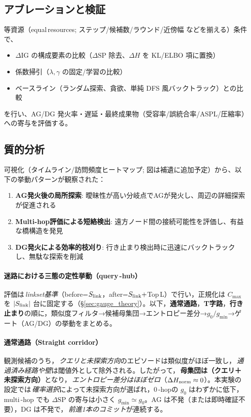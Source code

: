 \documentclass[ja=standard,xelatex]{bxjsarticle}
\begin{document}
\subsection{アブレーションと検証}
\label{sec:maze_ablation}
等資源（equal\,resources; ステップ/候補数/ラウンド/近傍幅 などを揃える）条件で、
\begin{itemize}
  \item $\Delta\mathrm{IG}$ の構成要素の比較（$\Delta\mathrm{SP}$ 除去、$\Delta H$ を KL/ELBO 項に置換）
  \item 係数掃引（$\lambda,\gamma$ の固定/学習の比較）
  \item ベースライン（ランダム探索、貪欲、単純 DFS 風バックトラック）との比較
\end{itemize}
を行い、AG/DG 発火率・遅延・最終成果物（受容率/誤統合率/ASPL/圧縮率）への寄与を評価する。

\subsection{質的分析}

可視化（タイムライン/訪問頻度ヒートマップ; 図は補遺に追加予定）から、以下の挙動パターンが観察された：
\begin{enumerate}
  \item \textbf{AG発火後の局所探索}: 曖昧性が高い分岐点でAGが発火し、周辺の詳細探索が促進される
  \item \textbf{Multi-hop評価による短絡検出}: 遠方ノード間の接続可能性を評価し、有益な橋構造を発見
  \item \textbf{DG発火による効率的枝刈り}: 行き止まり検出時に迅速にバックトラックし、無駄な探索を削減
\end{enumerate}

\paragraph{迷路における三態の定性挙動（query\,\mbox{-}hub）}
評価は\,\emph{linkset基準}（before=$S_{\rm link}$，after=$S_{\rm link}{+}$Top\,L）で行い，正規化は $C_{\max}$ を $|S_{\rm link}|$ 台に固定する（§\ref{sec:gauge_theory}）。以下，\textbf{通常通路}，\textbf{T字路}，\textbf{行き止まり}の順に，類似度フィルタ→候補母集団→エントロピー差分→$g_0/g_{\min}$→ゲート（AG/DG）の挙動をまとめる。

\paragraph{通常通路（Straight corridor）}
観測候補のうち，\,\emph{クエリと未探索方向}のエピソードは類似度がほぼ一致し，\,\emph{通過済み経路や壁}は閾値外として除外される。したがって，\,\textbf{母集団は（クエリ＋未探索方向）}となり，\,\emph{エントロピー差分はほぼゼロ}（$\Delta H_{\rm norm}\approx 0$）。本実験の設定では\,\emph{確率選択}によって未探索方向が選ばれ，0\,\mbox{-}hopの $g_0$ はわずかに低下，multi\,\mbox{-}hop でも $\Delta\mathrm{SP}$ の寄与は小さく $g_{\min}\simeq g_0$。AG は不発（または即時確証不要），DG は不発で，\,\emph{前進1本のコミット}が連続する。
\end{document}
